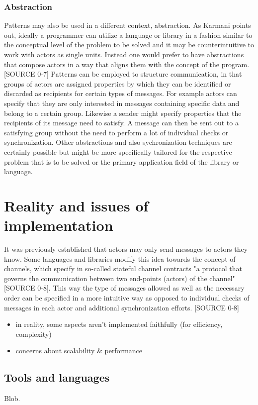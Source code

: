 \documentclass[A4]{article}
\begin{document}
\subsubsection{Abstraction}
Patterns may also be used in a different context, abstraction. As Karmani points out, ideally a programmer can utilize a language or library in a fashion similar to the conceptual level of the problem to be solved and it may be counterintuitive to work with actors as single units. Instead one would prefer to have abstractions that compose actors in a way that aligns them with the concept of the program. [SOURCE 0-7]
Patterns can be employed to structure communication, in that groups of actors are assigned properties by which they can be identified or discarded as recipients for certain types of messages. For example actors can specify that they are only interested in messages containing specific data and belong to a certain group. Likewise a sender might specify properties that the recipients of its message need to satisfy. A message can then be sent out to a satisfying group without the need to perform a lot of individual checks or synchronization. 
Other abstractions and also sychronization techniques are certainly possible but might be more specifically tailored for the respective problem that is to be solved or the primary application field of the library or language.

\section{Reality and issues of implementation}
It was previously established that actors may only send messages to actors they know. Some languages and libraries modify this idea towards the concept of channels, which specify in so-called stateful channel contracts "a protocol that governs the communication between two end-points (actors) of the channel" [SOURCE 0-8]. This way the type of messages allowed as well as the necessary order can be specified in a more intuitive way as opposed to individual checks of messages in each actor and additional synchronization efforts. [SOURCE 0-8]

\begin{itemize}
\item in reality, some aspects aren't implemented faithfully (for efficiency, complexity)
\item concerns about scalability \& performance
\end{itemize}
\subsection{Tools and languages}
Blob.
\end{document}
